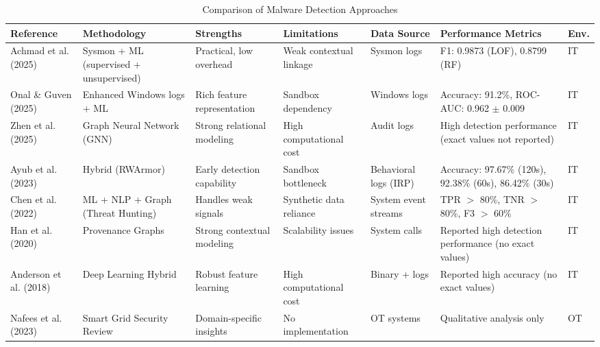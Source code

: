 \documentclass[conference]{IEEEtran}
\begin{document}
\begin{table}[!tb]
\caption{Comparison of Malware Detection Approaches}
\centering
\footnotesize
\setlength{\tabcolsep}{3pt}
\renewcommand{\arraystretch}{1.1}
\begin{tabularx}{\textwidth}{|L{2.2cm}|L{2.0cm}|Y|Y|L{1.4cm}|Y|L{0.8cm}|}
\hline
\textbf{Reference} & \textbf{Methodology} & \textbf{Strengths} & \textbf{Limitations} & \textbf{Data Source} & \textbf{Performance Metrics} & \textbf{Env.} \\
\hline

Achmad et al. (2025)
& Sysmon + ML (supervised + unsupervised)
& Practical, low overhead
& Weak contextual linkage
& Sysmon logs
& F1: 0.9873 (LOF), 0.8799 (RF)
& IT \\

\hline

Onal \& Guven (2025)
& Enhanced Windows logs + ML
& Rich feature representation
& Sandbox dependency
& Windows logs
& Accuracy: 91.2\%, ROC-AUC: 0.962 $\pm$ 0.009
& IT \\

\hline

Zhen et al. (2025)
& Graph Neural Network (GNN)
& Strong relational modeling
& High computational cost
& Audit logs
& High detection performance (exact values not reported)
& IT \\

\hline

Ayub et al. (2023)
& Hybrid (RWArmor)
& Early detection capability
& Sandbox bottleneck
& Behavioral logs (IRP)
& Accuracy: 97.67\% (120s), 92.38\% (60s), 86.42\% (30s)
& IT \\

\hline

Chen et al. (2022)
& ML + NLP + Graph (Threat Hunting)
& Handles weak signals
& Synthetic data reliance
& System event streams
& TPR $>$ 80\%, TNR $>$ 80\%, F3 $>$ 60\%
& IT \\

\hline

Han et al. (2020)
& Provenance Graphs
& Strong contextual modeling
& Scalability issues
& System calls
& Reported high detection performance (no exact values)
& IT \\

\hline

Anderson et al. (2018)
& Deep Learning Hybrid
& Robust feature learning
& High computational cost
& Binary + logs
& Reported high accuracy (no exact values)
& IT \\

\hline

Nafees et al. (2023)
& Smart Grid Security Review
& Domain-specific insights
& No implementation
& OT systems
& Qualitative analysis only
& OT \\

\hline

\end{tabularx}
\end{table}
\end{document}
